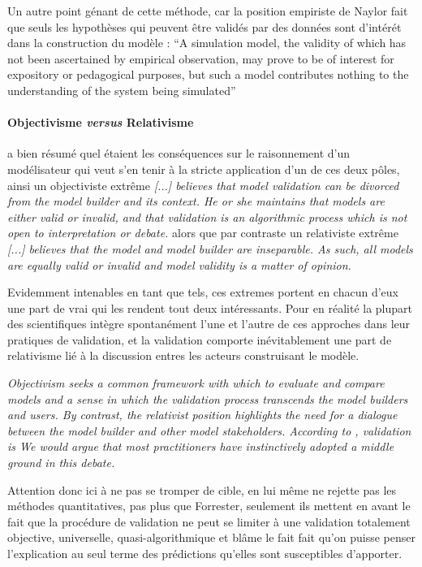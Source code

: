 Un autre point génant de cette méthode, car la position empiriste de Naylor fait que seuls les hypothèses qui peuvent être validés par des données sont d'intérét dans la construction du modèle : \enquote{A simulation model, the validity of which has not been ascertained by empirical observation, may prove to be of interest for expository or pedagogical purposes, but such a model contributes nothing to the understanding of the system being simulated} \autocite{Naylor1967}

\paragraph{Objectivisme \textit{versus} Relativisme}

\textcite{Kleindorfer1998} a bien résumé quel étaient les conséquences sur le raisonnement d'un modélisateur qui veut s'en tenir à la stricte application d'un de ces deux pôles, ainsi un objectiviste extrême \textit{[...] believes that model validation can be divorced from the model builder and its context. He or she maintains that models are either valid or invalid, and that validation is an algorithmic process which is not open to interpretation or debate.} alors que par contraste un relativiste extrême \textit{[...] believes that the model and model builder are inseparable. As such, all models are equally valid or invalid and model validity is a matter of opinion.}

Evidemment intenables en tant que tels, ces extremes portent en chacun d'eux une part de vrai qui les rendent tout deux intéressants. Pour \textcite{Kleindorfer1998} en réalité la plupart des scientifiques intègre spontanément l'une et l'autre de ces approches dans leur pratiques de validation, et la validation comporte inévitablement une part de relativisme lié à la discussion entres les acteurs construisant le modèle.

\textit{Objectivism seeks a common framework with which to evaluate and compare models and a sense in which the validation process transcends the model builders and users. By contrast, the relativist position highlights the need for a dialogue between the model builder and other model stakeholders. According to \autocite{Barlas1990}, validation is  We would argue that most practitioners have instinctively adopted a middle ground in this debate.} \autocite[1098]{Kleindorfer1998}

Attention donc ici à ne pas se tromper de cible, \textcite[188]{Barlas1996} en lui même ne rejette pas les méthodes quantitatives, pas plus que Forrester, seulement ils mettent en avant le fait que la procédure de validation ne peut se limiter à une validation totalement objective, universelle, quasi-algorithmique et blâme le fait fait qu'on puisse penser l'explication au seul terme des prédictions qu'elles sont susceptibles d'apporter.

